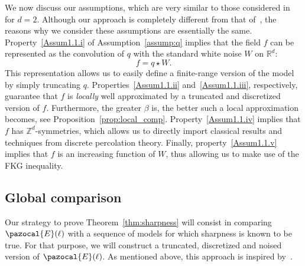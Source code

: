\documentclass[AHL,Unicode,longabstracts,published]{cedram}
\newcommand{\R}{\mathbb{R}}
\newcommand{\Z}{\mathbb{Z}}
\newcommand{\R}{\mathbb{R}}
\newcommand{\Z}{\mathbb{Z}}
\begin{document}
We now discuss our assumptions, which are very similar to those considered in~\cite{MV} for $d=2$. Although our approach is completely different from that of~\cite{MV}, the reasons why we consider these assumptions are essentially the same. Property~\eqref{Assum1.1.i} of Assumption~\ref{assump:q} implies that the field $f$ can be represented as the convolution of $q$ with the standard white noise $W$ on $\R^d$:
\begin{equation}
f=q\star W.
\end{equation}
This representation allows us to easily define a finite-range version of the model by simply truncating $q$. Properties~\eqref{Assum1.1.ii} and~\eqref{Assum1.1.iii}, respectively, guarantee that $f$ is \emph{locally} well approximated by a truncated and discretized version of $f$. Furthermore, the greater $\beta$ is, the better such a local approximation becomes, see Proposition~\ref{prop:local_comp}. Property~\eqref{Assum1.1.iv} implies that $f$ has $\Z^d$-symmetries, which allows us to directly import classical results and techniques from discrete percolation theory. Finally, property~\eqref{Assum1.1.v} implies that $f$ is an increasing function of $W$, thus allowing us to make use of the FKG inequality.


\subsection{Global comparison}
Our strategy to prove Theorem~\ref{thm:sharpness} will consist in comparing $\pazocal{E}(\ell)$ with a sequence of models for which sharpness is known to be true. For that purpose, we will construct a truncated, discretized and noised version of $\pazocal{E}(\ell)$. As mentioned above, this approach is inspired by~\cite{DGRS19}.
\end{document}
